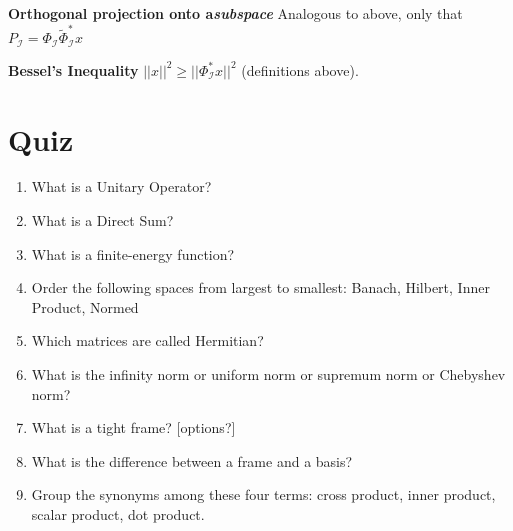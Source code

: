 \documentclass{article}
\begin{document}
\textbf{Orthogonal projection onto a\textit{subspace}}
Analogous to above, only that $P_{\mathcal{I}}=\Phi_{\mathcal{I}}\tilde{\Phi}_{\mathcal{I}}^{*}x$

\textbf{Bessel's Inequality} $||x||^2\ge ||\Phi_{\mathcal{I}}^{*}x||^2$ (definitions above).
\clearpage
\section*{Quiz}
\begin{enumerate}
\bf
\item What is a Unitary Operator?
\item What is a Direct Sum?
\item What is a finite-energy function?
\item Order the following spaces from largest to smallest: Banach, Hilbert, Inner Product, Normed
\item Which matrices are called Hermitian?
\item What is the infinity norm or uniform norm or supremum norm or Chebyshev norm?
\item What is a tight frame? [options?]
\item What is the difference between a frame and a basis?
\item Group the synonyms among these four terms: cross product, inner product, scalar product, dot product.
\end{enumerate}

\end{document}
